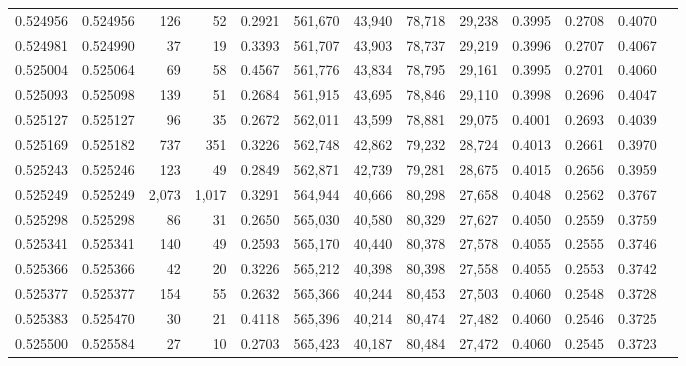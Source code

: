 \begin{tabular}{rrrrrrrrrrrrr}
0.524956 & 0.524956 &   126 &    52 &                                     0.2921 & 561,670 &  43,940 &  78,718 &  29,238 & 0.3995 & 0.2708 & 0.4070 \\
0.524981 & 0.524990 &    37 &    19 &                                     0.3393 & 561,707 &  43,903 &  78,737 &  29,219 & 0.3996 & 0.2707 & 0.4067 \\
0.525004 & 0.525064 &    69 &    58 &                                     0.4567 & 561,776 &  43,834 &  78,795 &  29,161 & 0.3995 & 0.2701 & 0.4060 \\
0.525093 & 0.525098 &   139 &    51 &                                     0.2684 & 561,915 &  43,695 &  78,846 &  29,110 & 0.3998 & 0.2696 & 0.4047 \\
0.525127 & 0.525127 &    96 &    35 &                                     0.2672 & 562,011 &  43,599 &  78,881 &  29,075 & 0.4001 & 0.2693 & 0.4039 \\
0.525169 & 0.525182 &   737 &   351 &                                     0.3226 & 562,748 &  42,862 &  79,232 &  28,724 & 0.4013 & 0.2661 & 0.3970 \\
0.525243 & 0.525246 &   123 &    49 &                                     0.2849 & 562,871 &  42,739 &  79,281 &  28,675 & 0.4015 & 0.2656 & 0.3959 \\
0.525249 & 0.525249 & 2,073 & 1,017 &                                     0.3291 & 564,944 &  40,666 &  80,298 &  27,658 & 0.4048 & 0.2562 & 0.3767 \\
0.525298 & 0.525298 &    86 &    31 &                                     0.2650 & 565,030 &  40,580 &  80,329 &  27,627 & 0.4050 & 0.2559 & 0.3759 \\
0.525341 & 0.525341 &   140 &    49 &                                     0.2593 & 565,170 &  40,440 &  80,378 &  27,578 & 0.4055 & 0.2555 & 0.3746 \\
0.525366 & 0.525366 &    42 &    20 &                                     0.3226 & 565,212 &  40,398 &  80,398 &  27,558 & 0.4055 & 0.2553 & 0.3742 \\
0.525377 & 0.525377 &   154 &    55 &                                     0.2632 & 565,366 &  40,244 &  80,453 &  27,503 & 0.4060 & 0.2548 & 0.3728 \\
0.525383 & 0.525470 &    30 &    21 &                                     0.4118 & 565,396 &  40,214 &  80,474 &  27,482 & 0.4060 & 0.2546 & 0.3725 \\
0.525500 & 0.525584 &    27 &    10 &                                     0.2703 & 565,423 &  40,187 &  80,484 &  27,472 & 0.4060 & 0.2545 & 0.3723 \\

\end{tabular}
